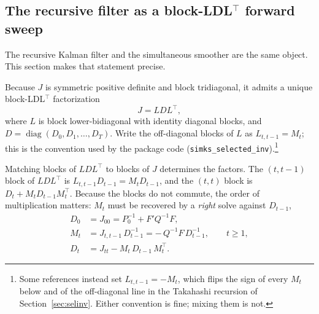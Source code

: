 \documentclass[11pt]{article}
\newcommand{\diag}{\operatorname{diag}}
\begin{document}
\subsection{The recursive filter as a block-LDL$^{\top}$ forward sweep}
\label{sec:ldl}
\label{sec:LDL}

The recursive Kalman filter and the simultaneous smoother are the same
object.  This section makes that statement precise.

Because $J$ is symmetric positive definite and block tridiagonal, it
admits a unique block-LDL$^\top$ factorization
\begin{equation}
J=LDL^\top,
\end{equation}
where $L$ is block lower-bidiagonal with identity diagonal blocks, and
$D=\diag(D_0,D_1,\ldots,D_T)$.  Write the off-diagonal blocks of $L$ as
$L_{t,t-1}=M_t$; this is the convention used by the package code
(\texttt{simks\_selected\_inv}).\footnote{Some references instead set
$L_{t,t-1}=-M_t$, which flips the sign of every $M_t$ below and of the
off-diagonal line in the Takahashi recursion of
Section~\ref{sec:selinv}.  Either convention is fine; mixing them is
not.}

Matching blocks of $LDL^\top$ to blocks of $J$ determines the factors.
The $(t,t-1)$ block of $LDL^\top$ is $L_{t,t-1}D_{t-1}=M_tD_{t-1}$, and
the $(t,t)$ block is $D_t+M_tD_{t-1}M_t^\top$.  Because the blocks do
not commute, the order of multiplication matters: $M_t$ must be
recovered by a \emph{right} solve against $D_{t-1}$,
\begin{align}
D_0 &= J_{00}=P_0^{-1}+F'Q^{-1}F,\\
M_t &= J_{t,t-1}\,D_{t-1}^{-1}=-\,Q^{-1}F\,D_{t-1}^{-1},
\qquad t\ge 1,\\
D_t &= J_{tt}-M_t\,D_{t-1}\,M_t^\top.
\label{eq:LDLstep}
\end{align}
\end{document}
